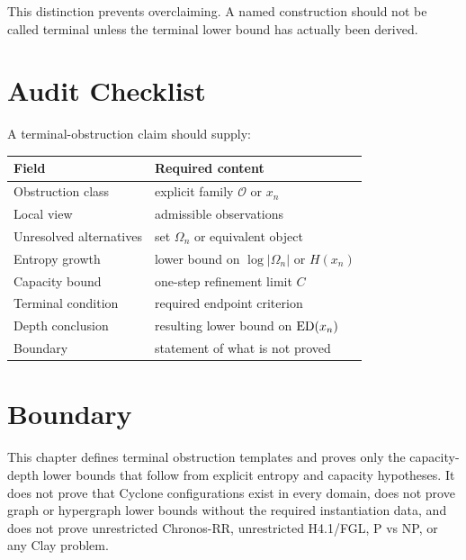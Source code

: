 This distinction prevents overclaiming. A named construction should not be
called terminal unless the terminal lower bound has actually been derived.

\section{Audit Checklist}

A terminal-obstruction claim should supply:

\begin{center}
\begin{tabular}{ll}
\toprule
Field & Required content \\
\midrule
Obstruction class & explicit family \(\mathcal O\) or \(x_n\) \\
Local view & admissible observations \\
Unresolved alternatives & set \(\Omega_n\) or equivalent object \\
Entropy growth & lower bound on \(\log |\Omega_n|\) or \(H(x_n)\) \\
Capacity bound & one-step refinement limit \(C\) \\
Terminal condition & required endpoint criterion \\
Depth conclusion & resulting lower bound on \(\mathrm{ED}(x_n)\) \\
Boundary & statement of what is not proved \\
\bottomrule
\end{tabular}
\end{center}

\section{Boundary}

This chapter defines terminal obstruction templates and proves only the
capacity-depth lower bounds that follow from explicit entropy and capacity
hypotheses. It does not prove that Cyclone configurations exist in every
domain, does not prove graph or hypergraph lower bounds without the required
instantiation data, and does not prove unrestricted Chronos-RR, unrestricted
H4.1/FGL, P vs NP, or any Clay problem.
